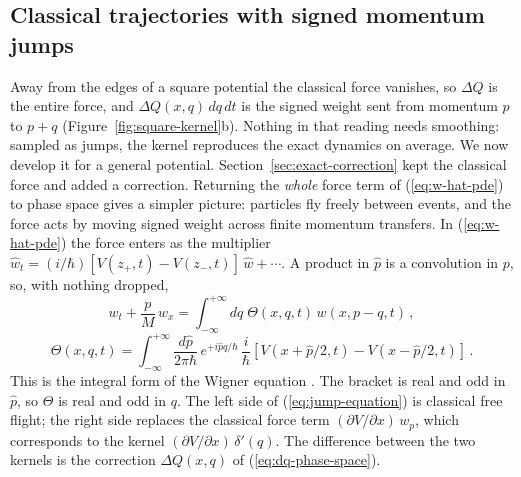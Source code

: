 \documentclass[12pt]{article}
\begin{document}
\subsection{Classical trajectories with signed momentum jumps}\label{sec:jumps}
Away from the edges of a square potential the classical force vanishes, so $\Delta Q$ is the entire force, and $\Delta Q(x,q)\,dq\,dt$ is the signed weight sent from momentum $p$ to $p+q$ (Figure~\ref{fig:square-kernel}b).  Nothing in that reading needs smoothing: sampled as jumps, the kernel reproduces the exact dynamics on average.  We now develop it for a general potential.  Section~\ref{sec:exact-correction} kept the classical force and added a correction.  Returning the \emph{whole} force term of (\ref{eq:w-hat-pde}) to phase space gives a simpler picture: particles fly freely between events, and the force acts by moving signed weight across finite momentum transfers.  In (\ref{eq:w-hat-pde}) the force enters as the multiplier $\hat{w}_t = (i/\hbar)[V(z_+,t)-V(z_-,t)]\,\hat{w} + \cdots$.  A product in $\hat{p}$ is a convolution in $p$, so, with nothing dropped,
\begin{equation}\label{eq:jump-equation}
w_t + \frac{p}{M}\,w_x = \int_{-\infty}^{+\infty} dq\; \Theta(x,q,t)\, w(x,p-q,t) \,,
\end{equation}
\begin{equation}\label{eq:jump-kernel}
\Theta(x,q,t) = \int_{-\infty}^{+\infty} \frac{d\hat{p}}{2\pi\hbar}\, e^{+i\hat{p}q/\hbar}\, \frac{i}{\hbar}\left[V(x+\hat{p}/2,t) - V(x-\hat{p}/2,t)\right] \,.
\end{equation}
This is the integral form of the Wigner equation \cite{wigner1932,hillery1984}.  The bracket is real and odd in $\hat{p}$, so $\Theta$ is real and odd in $q$.  The left side of (\ref{eq:jump-equation}) is classical free flight; the right side replaces the classical force term $(\partial V/\partial x)\, w_p$, which corresponds to the kernel $(\partial V/\partial x)\,\delta'(q)$.  The difference between the two kernels is the correction $\Delta Q(x,q)$ of (\ref{eq:dq-phase-space}).
\end{document}
